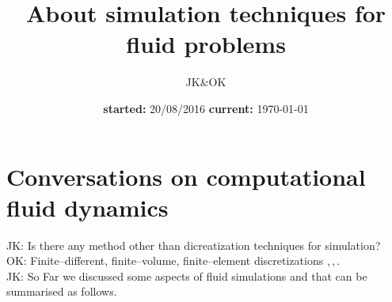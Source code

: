 \documentclass[12pt]{article}
\title{About simulation techniques for fluid problems}
\author{JK\&OK}
\date{\textbf{started:} 20/08/2016 \quad \textbf{current:} \specialdate\today}
\begin{document}
\maketitle


\section{Conversations on computational fluid dynamics}
\noindent
JK: Is there any method other than dicreatization techniques for simulation? \\
OK: Finite--different, finite--volume, finite--element discretizations \cite{FDsample},\,\cite{FEMsample},\,\cite{FVMsample}. \\[1em]

\noindent
JK: So Far we discussed some aspects of  fluid simulations and that can be summarised as follows.\\
\end{document}
